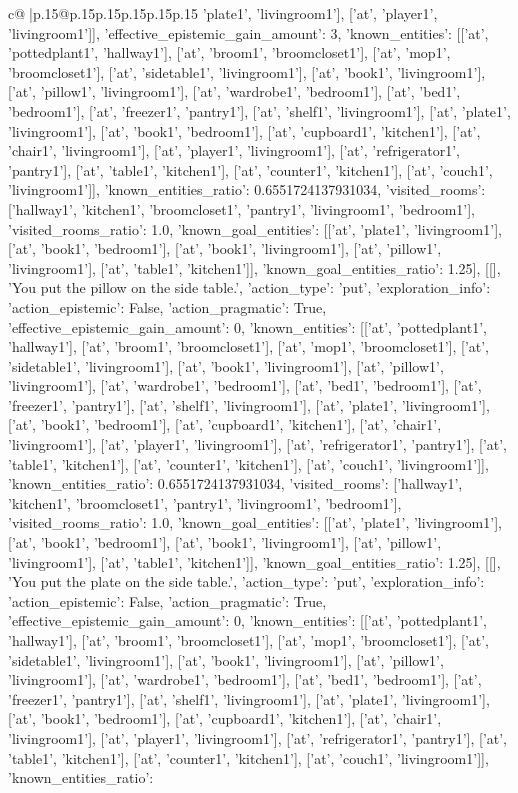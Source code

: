 \documentclass{article}
\begin{document}
{\begin{supertabular}{c@{$\;$}|p{.15\linewidth}@{}p{.15\linewidth}p{.15\linewidth}p{.15\linewidth}p{.15\linewidth}p{.15\linewidth}}
{{{'plate1', 'livingroom1'], ['at', 'player1', 'livingroom1']], 'effective_epistemic_gain_amount': 3, 'known_entities': [['at', 'pottedplant1', 'hallway1'], ['at', 'broom1', 'broomcloset1'], ['at', 'mop1', 'broomcloset1'], ['at', 'sidetable1', 'livingroom1'], ['at', 'book1', 'livingroom1'], ['at', 'pillow1', 'livingroom1'], ['at', 'wardrobe1', 'bedroom1'], ['at', 'bed1', 'bedroom1'], ['at', 'freezer1', 'pantry1'], ['at', 'shelf1', 'livingroom1'], ['at', 'plate1', 'livingroom1'], ['at', 'book1', 'bedroom1'], ['at', 'cupboard1', 'kitchen1'], ['at', 'chair1', 'livingroom1'], ['at', 'player1', 'livingroom1'], ['at', 'refrigerator1', 'pantry1'], ['at', 'table1', 'kitchen1'], ['at', 'counter1', 'kitchen1'], ['at', 'couch1', 'livingroom1']], 'known_entities_ratio': 0.6551724137931034, 'visited_rooms': ['hallway1', 'kitchen1', 'broomcloset1', 'pantry1', 'livingroom1', 'bedroom1'], 'visited_rooms_ratio': 1.0, 'known_goal_entities': [['at', 'plate1', 'livingroom1'], ['at', 'book1', 'bedroom1'], ['at', 'book1', 'livingroom1'], ['at', 'pillow1', 'livingroom1'], ['at', 'table1', 'kitchen1']], 'known_goal_entities_ratio': 1.25}}], [[], 'You put the pillow on the side table.', {'action_type': 'put', 'exploration_info': {'action_epistemic': False, 'action_pragmatic': True, 'effective_epistemic_gain_amount': 0, 'known_entities': [['at', 'pottedplant1', 'hallway1'], ['at', 'broom1', 'broomcloset1'], ['at', 'mop1', 'broomcloset1'], ['at', 'sidetable1', 'livingroom1'], ['at', 'book1', 'livingroom1'], ['at', 'pillow1', 'livingroom1'], ['at', 'wardrobe1', 'bedroom1'], ['at', 'bed1', 'bedroom1'], ['at', 'freezer1', 'pantry1'], ['at', 'shelf1', 'livingroom1'], ['at', 'plate1', 'livingroom1'], ['at', 'book1', 'bedroom1'], ['at', 'cupboard1', 'kitchen1'], ['at', 'chair1', 'livingroom1'], ['at', 'player1', 'livingroom1'], ['at', 'refrigerator1', 'pantry1'], ['at', 'table1', 'kitchen1'], ['at', 'counter1', 'kitchen1'], ['at', 'couch1', 'livingroom1']], 'known_entities_ratio': 0.6551724137931034, 'visited_rooms': ['hallway1', 'kitchen1', 'broomcloset1', 'pantry1', 'livingroom1', 'bedroom1'], 'visited_rooms_ratio': 1.0, 'known_goal_entities': [['at', 'plate1', 'livingroom1'], ['at', 'book1', 'bedroom1'], ['at', 'book1', 'livingroom1'], ['at', 'pillow1', 'livingroom1'], ['at', 'table1', 'kitchen1']], 'known_goal_entities_ratio': 1.25}}], [[], 'You put the plate on the side table.', {'action_type': 'put', 'exploration_info': {'action_epistemic': False, 'action_pragmatic': True, 'effective_epistemic_gain_amount': 0, 'known_entities': [['at', 'pottedplant1', 'hallway1'], ['at', 'broom1', 'broomcloset1'], ['at', 'mop1', 'broomcloset1'], ['at', 'sidetable1', 'livingroom1'], ['at', 'book1', 'livingroom1'], ['at', 'pillow1', 'livingroom1'], ['at', 'wardrobe1', 'bedroom1'], ['at', 'bed1', 'bedroom1'], ['at', 'freezer1', 'pantry1'], ['at', 'shelf1', 'livingroom1'], ['at', 'plate1', 'livingroom1'], ['at', 'book1', 'bedroom1'], ['at', 'cupboard1', 'kitchen1'], ['at', 'chair1', 'livingroom1'], ['at', 'player1', 'livingroom1'], ['at', 'refrigerator1', 'pantry1'], ['at', 'table1', 'kitchen1'], ['at', 'counter1', 'kitchen1'], ['at', 'couch1', 'livingroom1']], 'known_entities_ratio': }}}
\end{supertabular}}
\end{document}
